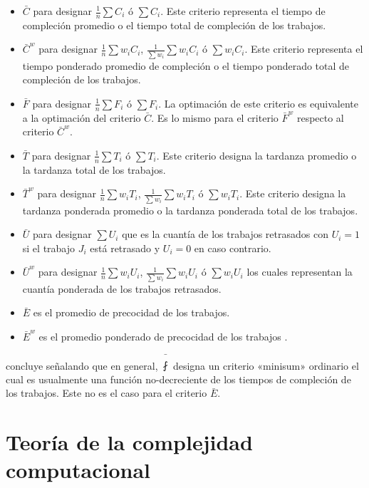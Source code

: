 \documentclass[spanish,draft,12pt,headsepline,footsepline,paper=letter]{scrreprt}
\begin{document}
\begin{itemize}
  \item $\bar{C}$ para designar $\frac{1}{n}\sum C_i$ ó $\sum C_i$. Este criterio representa el tiempo de compleción promedio o el tiempo total de compleción de los trabajos.
  \item $\bar{C}^w$ para designar $\frac{1}{n} \sum w_iC_i$, $\frac{1}{\sum w_i}\sum w_iC_i$ ó $\sum w_iC_i$. Este criterio representa el tiempo ponderado promedio de compleción o el tiempo ponderado total de compleción de los trabajos.
  \item $\bar{F}$ para designar $ \frac{1}{n}\sum F_i $ ó $\sum F_i$. La optimación de este criterio es equivalente a la optimación del criterio $\bar{C}$. Es lo mismo para el criterio $\bar{F}^w$ respecto al criterio $\bar{C}^w$.
  \item $\bar{T}$ para designar $\frac{1}{n}\sum T_i$ ó $\sum T_i$. Este criterio designa la tardanza promedio o la tardanza total de los trabajos.
  \item $\bar{T}^w$ para designar $\frac{1}{n}\sum w_iT_i$, $\frac{1}{\sum w_i}\sum w_iT_i$ ó $\sum w_iT_i$. Este criterio designa la tardanza ponderada promedio o la tardanza ponderada total de los trabajos.
  \item $\bar{U}$ para designar $\sum U_i$ que es la cuantía de los trabajos retrasados con $U_i=1$ si el trabajo $J_i$ está retrasado y $U_i=0$ en caso contrario.
  \item $\bar{U}^w$ para designar $\frac{1}{n}\sum w_iU_i$, $\frac{1}{\sum w_i}\sum w_iU_i$ ó $\sum w_iU_i$ los cuales representan la cuantía ponderada de los trabajos retrasados.
  \item $\bar{E}$ es el promedio de precocidad de los trabajos.
  \item $\bar{E}^w$ es el promedio ponderado de precocidad de los trabajos \citep[p.~14]{TKindt2002}.
\end{itemize}

\citet[p.~14]{TKindt2002} concluye señalando que en general, $\bar{\fint}$ designa un criterio «minisum» ordinario el cual es usualmente una función no\nobreakdash-decreciente de los tiempos de compleción de los trabajos. Este no es el caso para el criterio $\bar{E}$.

\section{Teoría de la complejidad computacional} %
\label{teoria_complejidad_computacional}
\end{document}
